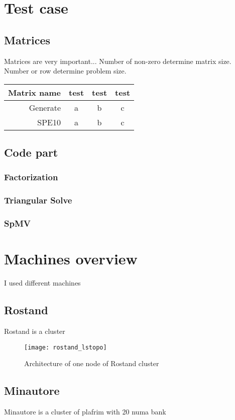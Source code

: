 \section{Test case}
\subsection{Matrices}
Matrices are very important...
Number of non-zero determine matrix size.
Number or row determine problem size.


\begin{tabular}{|r|c|c|c|}
        \hline
        Matrix name & test & test & test\\
        \hline
        Generate & a & b & c\\
        \hline
        SPE10 & a & b & c\\
        \hline
\end{tabular}

\subsection{Code part}
\subsubsection{Factorization}
\subsubsection{Triangular Solve}
\subsubsection{SpMV}


\section{Machines overview}
I used different machines


\subsection{Rostand}
Rostand is a cluster

\begin{figure}[!ht]
        \centering
        \texttt{[image: rostand\_lstopo]}
        \caption{Architecture of one node of Rostand cluster}
        \label{fig:rostand_lstopo}
\end{figure}

\subsection{Minautore}
Minautore is a cluster of plafrim with 20 numa bank

